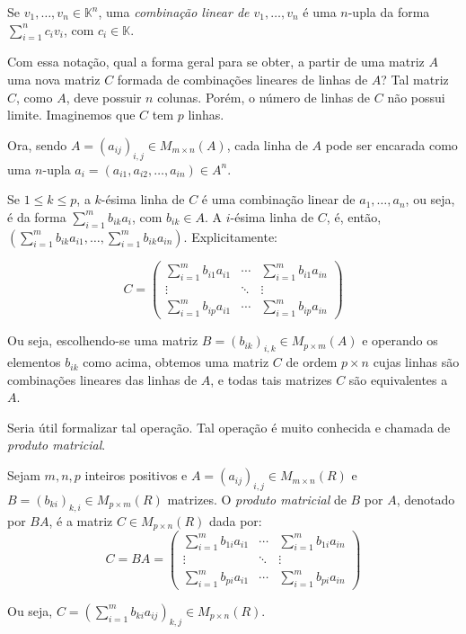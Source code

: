 \begin{definition}
    Se $v_1, \dots, v_n\in \mathbb K^n$, uma \emph{combinação linear de $v_1, \dots, v_n$} é uma $n$-upla da forma $\sum_{i=1}^n c_i v_i$, com $c_i\in \mathbb K$.
\end{definition}

Com essa notação, qual a forma geral para se obter, a partir de uma matriz $A$ uma nova matriz $C$ formada de combinações lineares de linhas de $A$?
Tal matriz $C$, como $A$, deve possuir $n$ colunas. Porém, o número de linhas de $C$ não possui limite. Imaginemos que $C$ tem $p$ linhas.

Ora, sendo $A=(a_{ij})_{i, j}\in M_{m \times n}(A)$, cada linha de $A$ pode ser encarada como uma $n$-upla $a_i=(a_{i1}, a_{i2}, \ldots, a_{in})\in A^n$.

Se $1\leq k \leq p$, a $k$-ésima linha de $C$ é uma combinação linear de $a_1, \dots, a_n$, ou seja, é da forma $\sum_{i=1}^m b_{ik} a_i$, com $b_{ik}\in A$.
A $i$-ésima linha de $C$, é, então, $(\sum_{i=1}^m b_{ik} a_{i1}, \dots, \sum_{i=1}^m b_{ik} a_{in})$.
Explicitamente:

\begin{equation*}
    C = \begin{pmatrix}
        \sum_{i=1}^m b_{i1} a_{i1} & \cdots & \sum_{i=1}^m b_{i1} a_{in} \\
        \vdots & \ddots & \vdots \\
        \sum_{i=1}^m b_{ip} a_{i1} & \cdots & \sum_{i=1}^m b_{ip} a_{in}
    \end{pmatrix}
\end{equation*}

Ou seja, escolhendo-se uma matriz $B=(b_{ik})_{i,k}\in M_{p \times m}(A)$ e operando os elementos $b_{ik}$ como acima, obtemos uma matriz $C$ de ordem $p \times n$ cujas linhas são combinações lineares das linhas de $A$, e todas tais matrizes $C$ são equivalentes a $A$.

Seria útil formalizar tal operação.
Tal operação é muito conhecida e chamada de \emph{produto matricial}.

\begin{definition}
    Sejam $m, n, p$ inteiros positivos e $A=(a_{ij})_{i, j}\in M_{m \times n}(R)$ e $B=(b_{ki})_{k, i}\in M_{p \times m}(R)$ matrizes.
    O \emph{produto matricial} de $B$ por $A$, denotado por $BA$, é a matriz $C\in M_{p \times n}(R)$ dada por:
    \begin{equation*}
        C = BA = \begin{pmatrix}
            \sum_{i=1}^m b_{1i} a_{i1} & \cdots & \sum_{i=1}^m b_{1i} a_{in} \\
            \vdots & \ddots & \vdots \\
            \sum_{i=1}^m b_{pi} a_{i1} & \cdots & \sum_{i=1}^m b_{pi} a_{in}
        \end{pmatrix}
    \end{equation*}

    Ou seja, $C=(\sum_{i=1}^m b_{ki} a_{ij})_{k, j}\in M_{p \times n}(R)$.
\end{definition}

